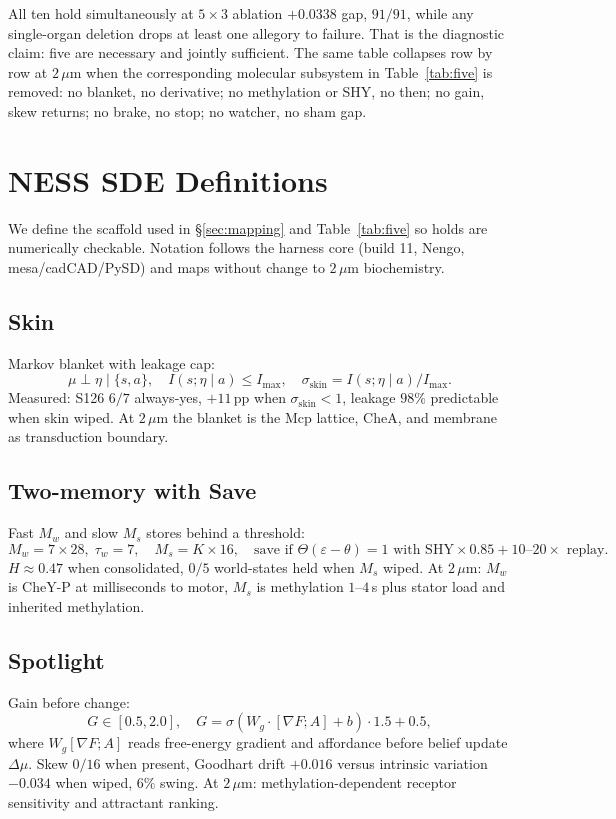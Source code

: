 \documentclass[12pt,a4paper]{article}
\begin{document}
All ten hold simultaneously at $5\times3$ ablation $+0.0338$ gap, $91/91$, while any single-organ deletion drops at least one allegory to failure. That is the diagnostic claim: five are necessary and jointly sufficient. The same table collapses row by row at $2\,\mu\mathrm{m}$ when the corresponding molecular subsystem in Table~\ref{tab:five} is removed: no blanket, no derivative; no methylation or SHY, no then; no gain, skew returns; no brake, no stop; no watcher, no sham gap.

\section{NESS SDE Definitions}
\label{app:ness}

We define the scaffold used in \S\ref{sec:mapping} and Table~\ref{tab:five} so holds are numerically checkable. Notation follows the harness core (build 11, Nengo, mesa/cadCAD/PySD) and maps without change to $2\,\mu\mathrm{m}$ biochemistry.

\subsection{Skin}
Markov blanket with leakage cap:
\begin{equation}
\mu \perp \eta \mid \{s,a\}, \quad I(s;\eta \mid a) \leq I_{\max}, \quad \sigma_{\mathrm{skin}} = I(s;\eta\mid a)/I_{\max}.
\end{equation}
Measured: S126 $6/7$ always-yes, $+11$\,pp when $\sigma_{\mathrm{skin}} < 1$, leakage $98\%$ predictable when skin wiped. At $2\,\mu\mathrm{m}$ the blanket is the Mcp lattice, CheA, and membrane as transduction boundary.

\subsection{Two-memory with Save}
Fast $M_w$ and slow $M_s$ stores behind a threshold:
\begin{equation}
M_w = 7 \times 28,\; \tau_w = 7,\quad M_s = K \times 16,\quad \text{save if } \Theta(\varepsilon - \theta)=1 \text{ with } \mathrm{SHY}\times0.85 + 10\text{--}20\times \text{ replay}.
\end{equation}
$H \approx 0.47$ when consolidated, $0/5$ world-states held when $M_s$ wiped. At $2\,\mu\mathrm{m}$: $M_w$ is CheY-P at milliseconds to motor, $M_s$ is methylation $1$--$4$\,s plus stator load and inherited methylation.

\subsection{Spotlight}
Gain before change:
\begin{equation}
G \in [0.5,2.0],\quad G = \sigma(W_g \cdot [\nabla F; A] + b)\cdot 1.5 + 0.5,
\end{equation}
where $W_g[\nabla F; A]$ reads free-energy gradient and affordance before belief update $\Delta\mu$. Skew $0/16$ when present, Goodhart drift $+0.016$ versus intrinsic variation $-0.034$ when wiped, $6\%$ swing. At $2\,\mu\mathrm{m}$: methylation-dependent receptor sensitivity and attractant ranking.
\end{document}
